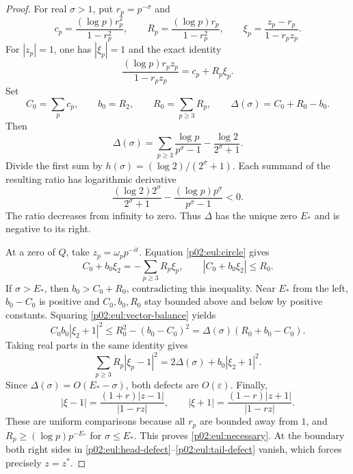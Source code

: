 \documentclass[11pt,letterpaper]{article}
\theoremstyle{definition}
\theoremstyle{remark}
\newcommand{\eps}{\varepsilon}
\newcommand{\1}{\mathbf 1}
\begin{document}
\begin{proof}
For real $\sigma>1$, put $r_p=p^{-\sigma}$ and
\[
 c_p=\frac{(\log p)r_p^2}{1-r_p^2},\qquad
 R_p=\frac{(\log p)r_p}{1-r_p^2},\qquad
 \xi_p=\frac{z_p-r_p}{1-r_pz_p}.
\]
For $|z_p|=1$, one has $|\xi_p|=1$ and the exact identity
\begin{equation}\label{p02:eul:circle}
 \frac{(\log p)r_pz_p}{1-r_pz_p}=c_p+R_p\xi_p.
\end{equation}
Set
\[
 C_0=\sum_pc_p,\qquad b_0=R_2,\qquad R_0=\sum_{p\ge3}R_p,
 \qquad \Delta(\sigma)=C_0+R_0-b_0.
\]
Then
\begin{equation}\label{p02:eul:Delta}
 \Delta(\sigma)=\sum_{p\ge3}\frac{\log p}{p^\sigma-1}
                   -\frac{\log2}{2^\sigma+1}.
\end{equation}
Divide the first sum by $h(\sigma)=(\log2)/(2^\sigma+1)$.
Each summand of the resulting ratio has logarithmic derivative
\[
 \frac{(\log2)2^\sigma}{2^\sigma+1}
 -\frac{(\log p)p^\sigma}{p^\sigma-1}<0.
\]
The ratio decreases from infinity to zero. Thus $\Delta$ has the
unique zero $E_*$ and is negative to its right.

At a zero of $Q$, take $z_p=\omega_pp^{-it}$. Equation
\eqref{p02:eul:circle} gives
\begin{equation}\label{p02:eul:vector-balance}
 C_0+b_0\xi_2=-\sum_{p\ge3}R_p\xi_p,
 \qquad |C_0+b_0\xi_2|\le R_0.
\end{equation}
If $\sigma>E_*$, then $b_0>C_0+R_0$, contradicting this inequality.
Near $E_*$ from the left, $b_0-C_0$ is positive and
$C_0,b_0,R_0$ stay bounded above and below by positive constants.
Squaring \eqref{p02:eul:vector-balance} yields
\begin{equation}\label{p02:eul:head-defect}
 C_0b_0|\xi_2+1|^2
 \le R_0^2-(b_0-C_0)^2
 =\Delta(\sigma)(R_0+b_0-C_0).
\end{equation}
Taking real parts in the same identity gives
\begin{equation}\label{p02:eul:tail-defect}
 \sum_{p\ge3}R_p|\xi_p-1|^2
 =2\Delta(\sigma)+b_0|\xi_2+1|^2.
\end{equation}
Since $\Delta(\sigma)=O(E_*-\sigma)$, both defects are $O(\eps)$.
Finally,
\[
 |\xi-1|=\frac{(1+r)|z-1|}{|1-rz|},\qquad
 |\xi+1|=\frac{(1-r)|z+1|}{|1-rz|}.
\]
These are uniform comparisons because all $r_p$ are bounded away
from $1$, and $R_p\ge(\log p)p^{-E_*}$ for $\sigma\le E_*$.
This proves \eqref{p02:eul:necessary}. At the boundary both right sides
in \eqref{p02:eul:head-defect}--\eqref{p02:eul:tail-defect} vanish, which
forces precisely $z=z^*$.
\end{proof}
\end{document}
